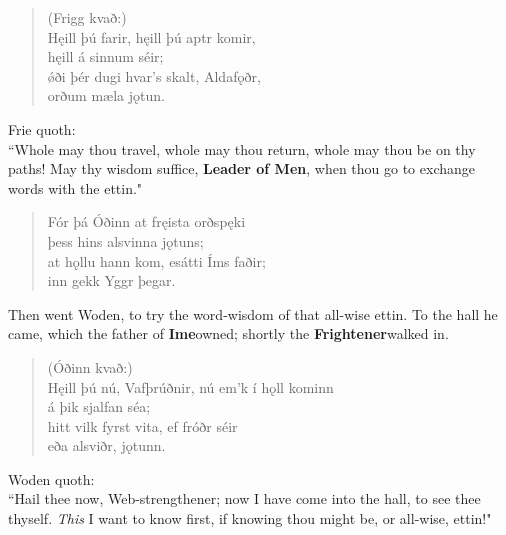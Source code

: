\begin{verse}
(Frigg kvað:) \\%
\bva Hęill þú farir, \hld hęill þú aptr komir, \\%
\ind hęill á sinnum séir; \\%
ǿði þér dugi \hld hvar's skalt, Aldafǫðr, \\%
\ind orðum mæla jǫtun.\\%
\end{verse}

\bvb Frie quoth: \\ “Whole may thou travel, whole may thou return, whole may thou be on thy paths! May thy wisdom suffice, \textbf{Leader of Men}, when thou go to exchange words with the ettin." \\

\begin{verse}
\bva Fór þá Óðinn \hld at fręista orðspęki \\%
\ind þess hins alsvinna jǫtuns; \\%
at hǫllu hann kom, \hld es\footnotemark[1] átti Íms faðir; \\%
\ind inn gekk Yggr þegar.\\%
\end{verse}

\bvb Then went Woden, to try the word-wisdom of that all-wise ettin. To the hall he came, which the father of \textbf{Ime}\footnotemark[5] owned; shortly the \textbf{Frightener}\footnotemark[6] walked in. \\

\begin{verse}
(Óðinn kvað:) \\%
\bva Hęill þú nú, Vafþrúðnir, \hld nú em'k í hǫll kominn \\%
\ind á þik sjalfan séa; \\%
hitt vilk fyrst vita, \hld ef fróðr séir \\%
\ind eða alsviðr, jǫtunn.\\%
\end{verse}

\bvb Woden quoth: \\ “Hail thee now, Web-strengthener; now I have come into the hall, to see thee thyself. \emph{This} I want to know first, if knowing thou might be, or all-wise, ettin!" \\


